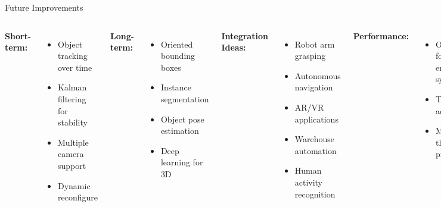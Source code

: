 \documentclass[aspectratio=169]{beamer}
\begin{document}
\begin{frame}{Future Improvements}
\begin{columns}
\textbf{Short-term:}
\begin{itemize}
    \item Object tracking over time
    \item Kalman filtering for stability
    \item Multiple camera support
    \item Dynamic reconfigure
\end{itemize}

\vspace{1em}
\textbf{Long-term:}
\begin{itemize}
    \item Oriented bounding boxes
    \item Instance segmentation
    \item Object pose estimation
    \item Deep learning for 3D
\end{itemize}

\textbf{Integration Ideas:}
\begin{itemize}
    \item Robot arm grasping
    \item Autonomous navigation
    \item AR/VR applications
    \item Warehouse automation
    \item Human activity recognition
\end{itemize}

\vspace{1em}
\textbf{Performance:}
\begin{itemize}
    \item Optimize for embedded systems
    \item TensorRT acceleration
    \item Multi-threaded processing
\end{itemize}
\end{columns}
\end{frame}
\end{document}
